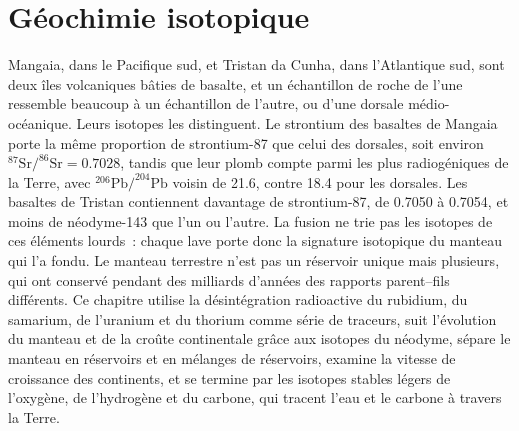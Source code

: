 \chapter{Géochimie isotopique}\label{ch:b2:isotope-geochemistry}

Mangaia, dans le Pacifique sud, et Tristan da Cunha, dans l'Atlantique sud,
sont deux îles volcaniques bâties de basalte, et un échantillon de roche de l'une
ressemble beaucoup à un échantillon de l'autre, ou d'une dorsale médio-océanique.
Leurs isotopes les distinguent. Le strontium des basaltes de Mangaia porte la même
proportion de strontium-87 que celui des dorsales, soit environ
$^{87}\mathrm{Sr}/^{86}\mathrm{Sr} = 0.7028$, tandis que leur plomb compte parmi les plus
radiogéniques de la Terre, avec $^{206}\mathrm{Pb}/^{204}\mathrm{Pb}$ voisin de 21.6, contre
18.4 pour les dorsales. Les basaltes de Tristan contiennent davantage de strontium-87, de 0.7050 à
0.7054, et moins de néodyme-143 que l'un ou l'autre. La fusion ne trie pas les isotopes de ces
éléments lourds~: chaque lave porte donc la signature isotopique du manteau qui l'a fondu.
Le manteau terrestre n'est pas un réservoir unique mais plusieurs, qui ont conservé pendant des
milliards d'années des rapports parent--fils différents. Ce chapitre utilise la désintégration
radioactive du rubidium, du samarium, de l'uranium
et du thorium comme série de traceurs, suit l'évolution du manteau et de la croûte
continentale grâce aux isotopes du néodyme, sépare le manteau en réservoirs et en
mélanges de réservoirs, examine la vitesse de croissance des continents,
et se termine par les isotopes stables légers de l'oxygène, de l'hydrogène et du carbone, qui
tracent l'eau et le carbone à travers la Terre.

